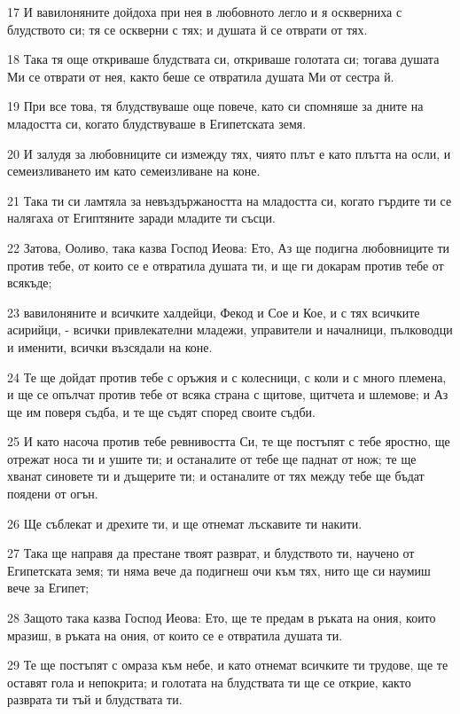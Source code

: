 \par 17 И вавилоняните дойдоха при нея в любовното легло и я оскверниха с блудството си; тя се оскверни с тях; и душата й се отврати от тях.
\par 18 Така тя още откриваше блудствата си, откриваше голотата си; тогава душата Ми се отврати от нея, както беше се отвратила душата Ми от сестра й.
\par 19 При все това, тя блудствуваше още повече, като си спомняше за дните на младостта си, когато блудствуваше в Египетската земя.
\par 20 И залудя за любовниците си измежду тях, чиято плът е като плътта на осли, и семеизливането им като семеизливане на коне.
\par 21 Така ти си ламтяла за невъздържаността на младостта си, когато гърдите ти се налягаха от Египтяните заради младите ти съсци.
\par 22 Затова, Ооливо, така казва Господ Иеова: Ето, Аз ще подигна любовниците ти против тебе, от които се е отвратила душата ти, и ще ги докарам против тебе от всякъде;
\par 23 вавилоняните и всичките халдейци, Фекод и Сое и Кое, и с тях всичките асирийци, - всички привлекателни младежи, управители и началници, пълководци и именити, всички възсядали на коне.
\par 24 Те ще дойдат против тебе с оръжия и с колесници, с коли и с много племена, и ще се опълчат против тебе от всяка страна с щитове, щитчета и шлемове; и Аз ще им поверя съдба, и те ще съдят според своите съдби.
\par 25 И като насоча против тебе ревнивостта Си, те ще постъпят с тебе яростно, ще отрежат носа ти и ушите ти; и останалите от тебе ще паднат от нож; те ще хванат синовете ти и дъщерите ти; и останалите от тях между тебе ще бъдат поядени от огън.
\par 26 Ще съблекат и дрехите ти, и ще отнемат лъскавите ти накити.
\par 27 Така ще направя да престане твоят разврат, и блудството ти, научено от Египетската земя; ти няма вече да подигнеш очи към тях, нито ще си наумиш вече за Египет;
\par 28 Защото така казва Господ Иеова: Ето, ще те предам в ръката на ония, които мразиш, в ръката на ония, от които се е отвратила душата ти.
\par 29 Те ще постъпят с омраза към небе, и като отнемат всичките ти трудове, ще те оставят гола и непокрита; и голотата на блудствата ти ще се открие, както разврата ти тъй и блудствата ти.
